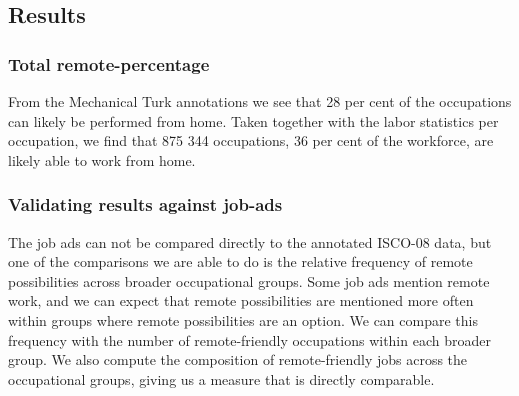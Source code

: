 \documentclass[]{article}
\begin{document}
\hypertarget{results}{%
\subsection{Results}\label{results}}

\hypertarget{total-remote-percentage}{%
\subsubsection{Total remote-percentage}\label{total-remote-percentage}}

From the Mechanical Turk annotations we see that 28 per cent of the
occupations can likely be performed from home. Taken together with the
labor statistics per occupation, we find that 875 344 occupations, 36
per cent of the workforce, are likely able to work from home.

\hypertarget{validating-results-against-job-ads}{%
\subsubsection{Validating results against
job-ads}\label{validating-results-against-job-ads}}

The job ads can not be compared directly to the annotated ISCO-08 data,
but one of the comparisons we are able to do is the relative frequency
of remote possibilities across broader occupational groups. Some job ads
mention remote work, and we can expect that remote possibilities are
mentioned more often within groups where remote possibilities are an
option. We can compare this frequency with the number of remote-friendly
occupations within each broader group. We also compute the composition
of remote-friendly jobs across the occupational groups, giving us a
measure that is directly comparable.
\end{document}
